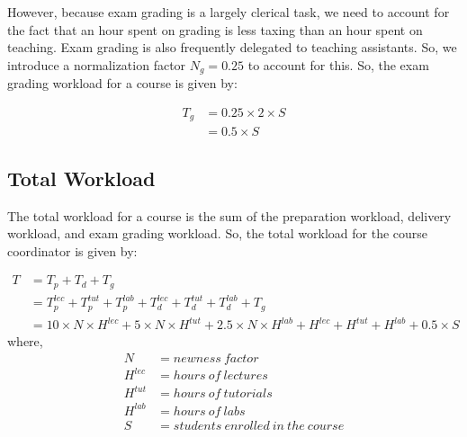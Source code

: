 However, because exam grading is a largely clerical task, we need to account for the fact that an hour spent on grading is less taxing than an hour spent on teaching. Exam grading is also frequently delegated to teaching assistants. So, we introduce a normalization factor \(N_g = 0.25\) to account for this. So, the exam grading workload for a course is given by:

\begin{equation}
  \label{eqn:exam-grading-workload}
  \begin{aligned}
    T_g & = 0.25 \times 2 \times S \\
        & = 0.5 \times S
  \end{aligned}
\end{equation}

\subsection{Total Workload}

The total workload for a course is the sum of the preparation workload, delivery workload, and exam grading workload. So, the total workload for the course coordinator is given by:

\begin{equation}
  \label{eqn:total-workload}
  \begin{aligned}
    T & = T_p + T_d + T_g                                                                                                                   \\
      & = T_p^{lec} + T_p^{tut} + T_p^{lab} + T_d^{lec} + T_d^{tut} + T_d^{lab} + T_g                                                       \\
      & = 10 \times N \times H^{lec} + 5 \times N \times H^{tut} + 2.5 \times N \times H^{lab} + H^{lec} + H^{tut} + H^{lab} + 0.5 \times S
  \end{aligned}
\end{equation}
where,
\begin{equation}
  \nonumber
  \begin{aligned}
    N       & = newness\ factor                     \\
    H^{lec} & = hours\ of\ lectures                 \\
    H^{tut} & = hours\ of\ tutorials                \\
    H^{lab} & = hours\ of\ labs                     \\
    S       & = students\ enrolled\ in\ the\ course
  \end{aligned}
\end{equation}


